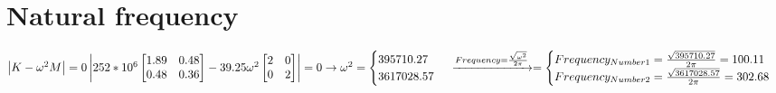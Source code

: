 \documentclass{article}
\begin{document}
\section{Natural frequency}
    \begin{math}
        \begin{vmatrix}
        K-\omega^2M
        \end{vmatrix}=0
        \newline
        \begin{vmatrix}
            252*10^6
            \begin{bmatrix}
            1.89 & 0.48\\
            0.48 & 0.36
            \end{bmatrix}
            -39.25\omega^2
            \begin{bmatrix}
            2 & 0\\
            0 & 2
            \end{bmatrix}
        \end{vmatrix}=0
        \rightarrow \omega^2=
        \begin{cases}
        395710.27\\
        3617028.57
        \end{cases}
        \newline
        \xrightarrow{Frequency=\frac{\sqrt{\omega^2}}{2\pi}}=
        \begin{cases}
        Frequency_{Number1}=\frac{\sqrt{395710.27}}{2\pi}=100.11\\
        Frequency_{Number2}=\frac{\sqrt{3617028.57}}{2\pi}=302.68
        \end{cases}
    \end{math}
\end{document}
